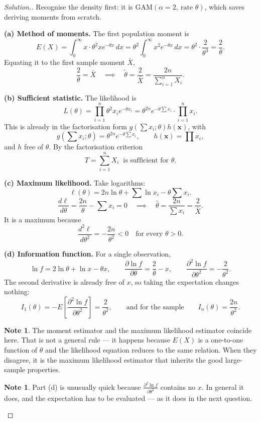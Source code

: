\documentclass[12pt,a4paper]{report}
\theoremstyle{definition}
\newtheorem{note}[thm]{Note}
\theoremstyle{plain}
\newenvironment{solution}
  {\renewcommand{\qedsymbol}{}\begin{proof}[\textit{Solution}.]}
  {\end{proof}}
\begin{document}
\begin{solution}
Recognise the density first: it is $\text{GAM}(\alpha=2,\ \text{rate }\theta)$, which
saves deriving moments from scratch.

\textbf{(a) Method of moments.} The first population moment is
\[E(X)=\int_0^\infty x\cdot\theta^2xe^{-\theta x}\,dx
=\theta^2\int_0^\infty x^2e^{-\theta x}\,dx=\theta^2\cdot\frac{2}{\theta^3}
=\frac{2}{\theta}.\]
Equating it to the first sample moment $\bar X$,
\[\frac{2}{\theta}=\bar X\quad\implies\quad \tilde\theta=\frac{2}{\bar X}
=\frac{2n}{\sum_{i=1}^n X_i}.\]

\textbf{(b) Sufficient statistic.} The likelihood is
\[L(\theta)=\prod_{i=1}^n\theta^2x_ie^{-\theta x_i}
=\theta^{2n}e^{-\theta\sum x_i}\cdot\prod_{i=1}^n x_i.\]
This is already in the factorisation form $g\!\left(\sum x_i;\theta\right)h(\mathbf{x})$,
with
\[g\!\left(\textstyle\sum x_i;\theta\right)=\theta^{2n}e^{-\theta\sum x_i},
\qquad h(\mathbf{x})=\prod x_i,\]
and $h$ free of $\theta$. By the factorisation criterion
\[T=\sum_{i=1}^n X_i\ \text{ is sufficient for }\theta.\]

\textbf{(c) Maximum likelihood.} Take logarithms:
\[\ell(\theta)=2n\ln\theta+\sum\ln x_i-\theta\sum x_i.\]
\[\frac{d\ell}{d\theta}=\frac{2n}{\theta}-\sum x_i=0
\quad\implies\quad \hat\theta=\frac{2n}{\sum x_i}=\frac{2}{\bar X}.\]
It is a maximum because
\[\frac{d^2\ell}{d\theta^2}=-\frac{2n}{\theta^2}<0\quad\text{for every }\theta>0.\]

\textbf{(d) Information function.} For a single observation,
\[\ln f=2\ln\theta+\ln x-\theta x,\qquad
\frac{\partial\ln f}{\partial\theta}=\frac{2}{\theta}-x,\qquad
\frac{\partial^2\ln f}{\partial\theta^2}=-\frac{2}{\theta^2}.\]
The second derivative is already free of $x$, so taking the expectation changes
nothing:
\[I_1(\theta)=-E\!\left[\frac{\partial^2\ln f}{\partial\theta^2}\right]
=\frac{2}{\theta^2},\qquad\text{and for the sample}\qquad
I_n(\theta)=\frac{2n}{\theta^2}.\]

\begin{note}
The moment estimator and the maximum likelihood estimator coincide here. That is
not a general rule --- it happens because $E(X)$ is a one-to-one function of
$\theta$ and the likelihood equation reduces to the same relation. When they
disagree, it is the maximum likelihood estimator that inherits the good
large-sample properties.
\end{note}

\begin{note}
Part (d) is unusually quick because $\frac{\partial^2\ln f}{\partial\theta^2}$
contains no $x$. In general it does, and the expectation has to be evaluated ---
as it does in the next question.
\end{note}
\end{solution}
\end{document}
